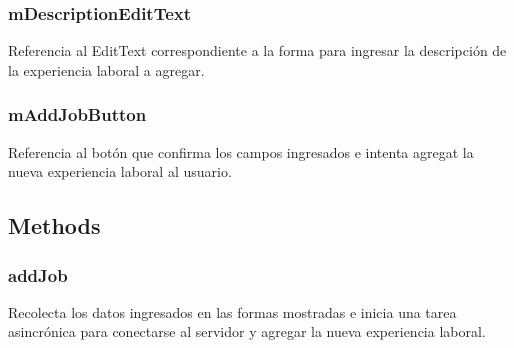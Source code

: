 \documentclass[letterpaper,10pt,english]{sphinxmanual}
\begin{document}
\subsubsection{mDescriptionEditText}
\label{Fragments/AddJobFragment:mdescriptionedittext}

\begin{fulllineitems}
\label{Fragments/AddJobFragment:com.fiuba.tallerii.jobify.AddJobFragment.mDescriptionEditText}
Referencia al EditText correspondiente a la forma para ingresar la descripción de la experiencia laboral a agregar.

\end{fulllineitems}



\subsubsection{mAddJobButton}
\label{Fragments/AddJobFragment:maddjobbutton}

\begin{fulllineitems}
\label{Fragments/AddJobFragment:com.fiuba.tallerii.jobify.AddJobFragment.mAddJobButton}
Referencia al botón que confirma los campos ingresados e intenta agregat la nueva experiencia laboral al usuario.

\end{fulllineitems}



\subsection{Methods}
\label{Fragments/AddJobFragment:methods}

\subsubsection{addJob}
\label{Fragments/AddJobFragment:addjob}

\begin{fulllineitems}
\label{Fragments/AddJobFragment:com.fiuba.tallerii.jobify.AddJobFragment.addSkill()}
Recolecta los datos ingresados en las formas mostradas e inicia una tarea asincrónica para conectarse al servidor y agregar la nueva experiencia laboral.

\end{fulllineitems}
\end{document}
